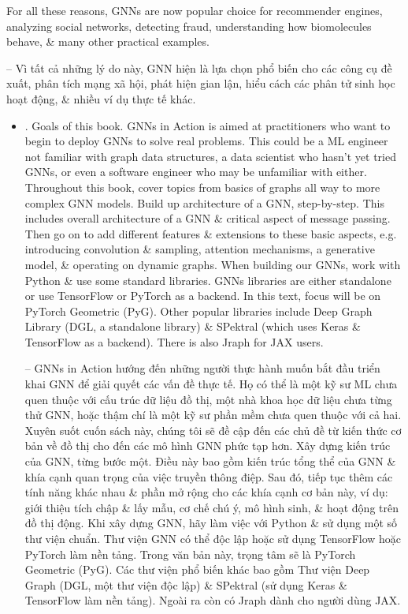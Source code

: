 \documentclass{article}
\begin{document}
\begin{itemize}
    For all these reasons, GNNs are now popular choice for recommender engines, analyzing social networks, detecting fraud, understanding how biomolecules behave, \& many other practical examples.

    -- Vì tất cả những lý do này, GNN hiện là lựa chọn phổ biến cho các công cụ đề xuất, phân tích mạng xã hội, phát hiện gian lận, hiểu cách các phân tử sinh học hoạt động, \& nhiều ví dụ thực tế khác.
    \begin{itemize}
        \item {. Goals of this book.} GNNs in Action is aimed at practitioners who want to begin to deploy GNNs to solve real problems. This could be a ML engineer not familiar with graph data structures, a data scientist who hasn't yet tried GNNs, or even a software engineer who may be unfamiliar with either. Throughout this book, cover topics from basics of graphs all way to more complex GNN models. Build up architecture of a GNN, step-by-step. This includes overall architecture of a GNN \& critical aspect of message passing. Then go on to add different features \& extensions to these basic aspects, e.g. introducing convolution \& sampling, attention mechanisms, a generative model, \& operating on dynamic graphs. When building our GNNs, work with Python \& use some standard libraries. GNNs libraries are either standalone or use TensorFlow or PyTorch as a backend. In this text, focus will be on PyTorch Geometric (PyG). Other popular libraries include Deep Graph Library (DGL, a standalone library) \& SPektral (which uses Keras \& TensorFlow as a backend). There is also Jraph for JAX users.

        -- GNNs in Action hướng đến những người thực hành muốn bắt đầu triển khai GNN để giải quyết các vấn đề thực tế. Họ có thể là một kỹ sư ML chưa quen thuộc với cấu trúc dữ liệu đồ thị, một nhà khoa học dữ liệu chưa từng thử GNN, hoặc thậm chí là một kỹ sư phần mềm chưa quen thuộc với cả hai. Xuyên suốt cuốn sách này, chúng tôi sẽ đề cập đến các chủ đề từ kiến thức cơ bản về đồ thị cho đến các mô hình GNN phức tạp hơn. Xây dựng kiến trúc của GNN, từng bước một. Điều này bao gồm kiến trúc tổng thể của GNN \& khía cạnh quan trọng của việc truyền thông điệp. Sau đó, tiếp tục thêm các tính năng khác nhau \& phần mở rộng cho các khía cạnh cơ bản này, ví dụ: giới thiệu tích chập \& lấy mẫu, cơ chế chú ý, mô hình sinh, \& hoạt động trên đồ thị động. Khi xây dựng GNN, hãy làm việc với Python \& sử dụng một số thư viện chuẩn. Thư viện GNN có thể độc lập hoặc sử dụng TensorFlow hoặc PyTorch làm nền tảng. Trong văn bản này, trọng tâm sẽ là PyTorch Geometric (PyG). Các thư viện phổ biến khác bao gồm Thư viện Deep Graph (DGL, một thư viện độc lập) \& SPektral (sử dụng Keras \& TensorFlow làm nền tảng). Ngoài ra còn có Jraph dành cho người dùng JAX.


\end{itemize}
\end{itemize}
\end{document}
